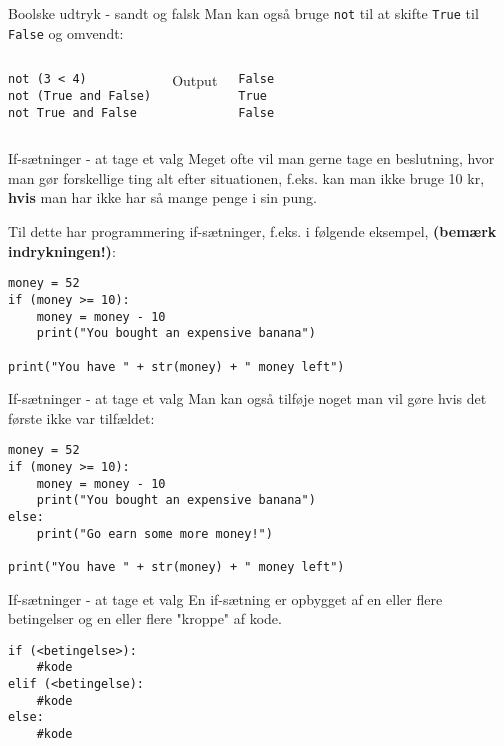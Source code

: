 \documentclass[main.tex]{subfiles}
\begin{document}
\begin{frame}[fragile]{Boolske udtryk - sandt og falsk}
	Man kan også bruge \texttt{not} til at skifte \texttt{True} til \texttt{False} og omvendt:
	\begin{columns}
		\begin{lstlisting}[style=python]
not (3 < 4)
not (True and False)
not True and False
		\end{lstlisting}
		\pause
		Output
		\begin{lstlisting}[style=python]
False
True
False
		\end{lstlisting}
	\end{columns}
\end{frame}



\begin{frame}[fragile]{If-sætninger - at tage et valg}
	Meget ofte vil man gerne tage en beslutning, hvor man gør forskellige ting alt efter situationen, f.eks. kan man ikke bruge 10 kr, \textbf{hvis} man har ikke har så mange penge i sin pung.
	
	Til dette har programmering if-sætninger, f.eks. i følgende eksempel, \textbf{(bemærk indrykningen!)}:
	\begin{lstlisting}[style=python]
money = 52
if (money >= 10):
    money = money - 10
    print("You bought an expensive banana")
		
print("You have " + str(money) + " money left")
	\end{lstlisting}
\end{frame}


\begin{frame}[fragile]{If-sætninger - at tage et valg}
Man kan også tilføje noget man vil gøre hvis det første ikke var tilfældet:

\begin{lstlisting}[style=python]
money = 52
if (money >= 10):
	money = money - 10
	print("You bought an expensive banana")
else:
	print("Go earn some more money!")

print("You have " + str(money) + " money left")
\end{lstlisting}
\end{frame}

\begin{frame}[fragile]{If-sætninger - at tage et valg}
	En if-sætning er opbygget af en eller flere betingelser og en eller flere "kroppe" af kode.
	
	\begin{lstlisting}[style=python]
if (<betingelse>):
	#kode
elif (<betingelse):
	#kode
else:
	#kode
	\end{lstlisting}
\end{frame}
\end{document}
